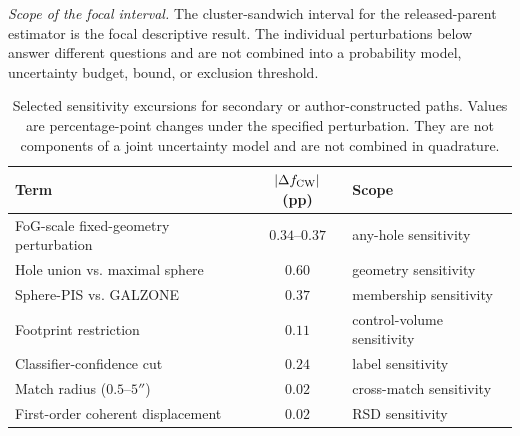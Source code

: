 \documentclass[aps,prd,twocolumn,superscriptaddress,showpacs,preprintnumbers,nofootinbib,longbibliography,floatfix]{revtex4-2}
\begin{document}
\emph{Scope of the focal interval.} The cluster-sandwich interval for
the released-parent estimator is the focal descriptive result.
The individual perturbations below answer different questions and are
not combined into a probability model, uncertainty budget, bound, or
exclusion threshold.

\begin{table}[ht]
\caption{Selected sensitivity excursions for secondary or
author-constructed paths. Values are percentage-point changes under the
specified perturbation. They are not components of a joint uncertainty
model and are not combined in quadrature.}
\label{tab:systematic_budget}
\begin{ruledtabular}
\begin{tabular}{lcl}
Term & $|\Delta f_{\rm CW}|$ (pp) & Scope \\
\hline
FoG-scale fixed-geometry perturbation & $0.34$--$0.37$ & any-hole sensitivity \\
Hole union vs. maximal sphere & $0.60$ & geometry sensitivity \\
Sphere-PIS vs. GALZONE & $0.37$ & membership sensitivity \\
Footprint restriction & $0.11$ & control-volume sensitivity \\
Classifier-confidence cut & $0.24$ & label sensitivity \\
Match radius ($0.5$--$5''$) & $0.02$ & cross-match sensitivity \\
First-order coherent displacement & $0.02$ & RSD sensitivity \\
\end{tabular}
\end{ruledtabular}
\end{table}
\end{document}
